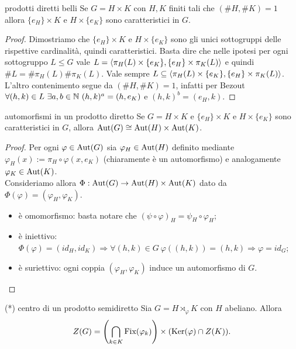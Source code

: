 \begin{proposition}{prodotti diretti belli}
    Se $G = H \times K$ con $H,K$ finiti tali che $(\#H, \#K) = 1$ allora $\{e_H\} \times K$ e $H \times \{e_K\}$ sono caratteristici in $G$.
\end{proposition}
\begin{proof}
    Dimostriamo che $\{e_H\} \times K$ e $H \times \{e_K\}$ sono gli unici sottogruppi delle rispettive cardinalità, quindi caratteristici. Basta dire che nelle ipotesi per ogni sottogruppo $L \le G$ vale $L = \langle \pi_H(L) \times \{e_K\}, \{e_H\} \times \pi_K(L) \rangle$ e quindi $\#L = \#\pi_H(L) \#\pi_K(L)$. Vale sempre $L \subseteq \langle \pi_H(L) \times \{e_K\}, \{e_H\} \times \pi_K(L) \rangle$. L'altro contenimento segue da $(\#H, \#K) = 1$, infatti per Bezout $\forall (h, k) \in L \ \exists a, b \in \N \ (h, k)^a = (h, e_K)$ e $(h, k)^b = (e_H, k)$.
\end{proof}
\begin{proposition}{automorfismi in un prodotto diretto}
    Se $G = H \times K$ e $\{e_H\} \times K$ e $H \times \{e_K\}$ sono caratteristici in $G$, allora $\text{Aut}(G) \cong \text{Aut}(H) \times \text{Aut}(K)$. 
\end{proposition}
\begin{proof}
    Per ogni $\varphi \in \text{Aut}(G)$ sia $\varphi_H \in \text{Aut}(H)$ definito mediante $\varphi_H(x) := \pi_H \circ \varphi (x, e_K)$ (chiaramente è un automorfismo) e analogamente $\varphi_K \in \text{Aut}(K)$. \\
    Consideriamo allora $\Phi: \text{Aut}(G) \rightarrow \text{Aut}(H) \times \text{Aut}(K)$ dato da $\Phi(\varphi) = (\varphi_H, \varphi_K)$. 
\begin{itemize}
    \item è omomorfismo: basta notare che $(\psi \circ \varphi)_H = \psi_H \circ \varphi_H$;
    \item è iniettivo: $\Phi(\varphi)=(id_H,id_K) \Rightarrow \forall (h, k) \in G \ \varphi((h, k)) = (h, k) \Rightarrow \varphi = id_G$;
    \item è suriettivo: ogni coppia $(\varphi_H,\varphi_K)$ induce un automorfismo di $G$.
\end{itemize}
\end{proof} 
\begin{proposition}{(*) centro di un prodotto semidiretto}
    Sia $G= H \rtimes_{\varphi} K$ con $H$ abeliano. Allora
    \[
    Z(G) = \left( \bigcap_{k \in K} \text{Fix}(\varphi_k) \right) \times (\text{Ker}(\varphi) \cap Z(K)).
    \]
\end{proposition}
